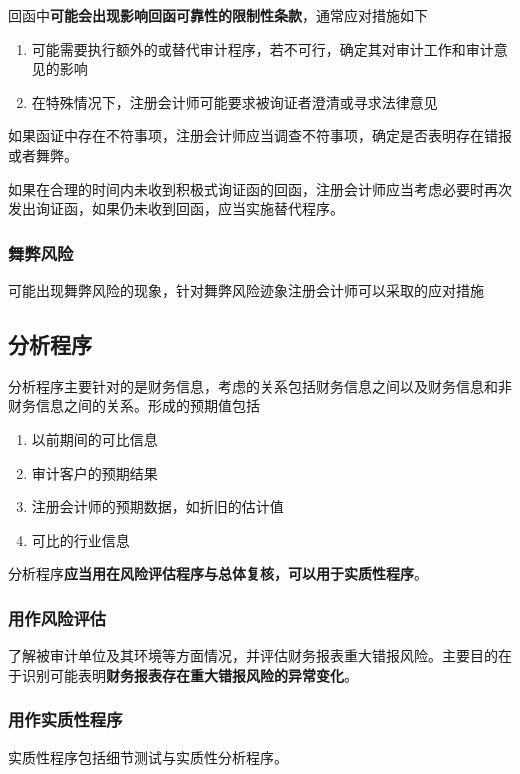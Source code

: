 \documentclass[UTF8,12pt]{ctexart}
\numberwithin{equation}{section} %
\numberwithin{figure}{section}
\numberwithin{table}{section}
\begin{document}
	回函中\textbf{可能会出现影响回函可靠性的限制性条款}，通常应对措施如下
	\begin{enumerate}
		\item 可能需要执行额外的或替代审计程序，若不可行，确定其对审计工作和审计意见的影响
		
		\item 在特殊情况下，注册会计师可能要求被询证者澄清或寻求法律意见
	\end{enumerate}
	
	如果函证中存在不符事项，注册会计师应当调查不符事项，确定是否表明存在错报或者舞弊。
	
	如果在合理的时间内未收到积极式询证函的回函，注册会计师应当考虑必要时再次发出询证函，如果仍未收到回函，应当实施替代程序。
	
	\subsubsection{舞弊风险}
	
	可能出现舞弊风险的现象，针对舞弊风险迹象注册会计师可以采取的应对措施
	
	\subsection{分析程序}
	分析程序主要针对的是财务信息，考虑的关系包括财务信息之间以及财务信息和非财务信息之间的关系。形成的预期值包括
	\begin{enumerate}
		\item 以前期间的可比信息
		
		\item 审计客户的预期结果
		
		\item 注册会计师的预期数据，如折旧的估计值
		
		\item 可比的行业信息
	\end{enumerate}
	
	分析程序\textbf{应当用在风险评估程序与总体复核，可以用于实质性程序}。
	
	\subsubsection{用作风险评估}
	了解被审计单位及其环境等方面情况，并评估财务报表重大错报风险。主要目的在于识别可能表明\textbf{财务报表存在重大错报风险的异常变化}。
	
	\subsubsection{用作实质性程序}
	实质性程序包括细节测试与实质性分析程序。
	
\end{document}
